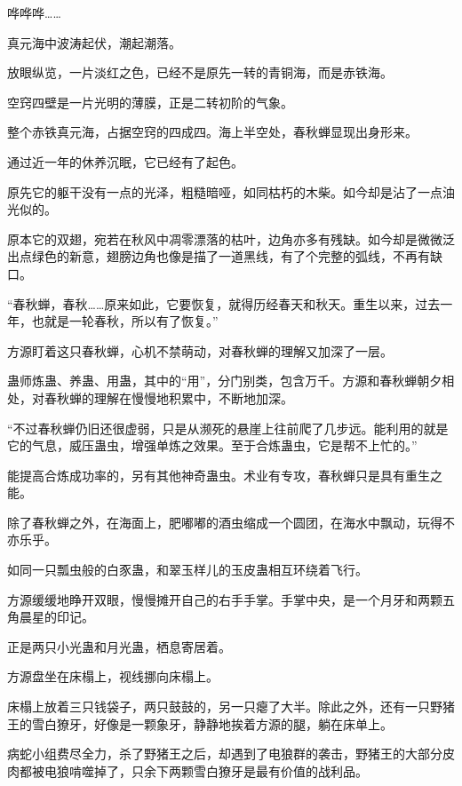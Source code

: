 
\begin{this_body}

哗哗哗……

真元海中波涛起伏，潮起潮落。

放眼纵览，一片淡红之色，已经不是原先一转的青铜海，而是赤铁海。

空窍四壁是一片光明的薄膜，正是二转初阶的气象。

整个赤铁真元海，占据空窍的四成四。海上半空处，春秋蝉显现出身形来。

通过近一年的休养沉眠，它已经有了起色。

原先它的躯干没有一点的光泽，粗糙暗哑，如同枯朽的木柴。如今却是沾了一点油光似的。

原本它的双翅，宛若在秋风中凋零漂落的枯叶，边角亦多有残缺。如今却是微微泛出点绿色的新意，翅膀边角也像是描了一道黑线，有了个完整的弧线，不再有缺口。

“春秋蝉，春秋……原来如此，它要恢复，就得历经春天和秋天。重生以来，过去一年，也就是一轮春秋，所以有了恢复。”

方源盯着这只春秋蝉，心机不禁萌动，对春秋蝉的理解又加深了一层。

蛊师炼蛊、养蛊、用蛊，其中的“用”，分门别类，包含万千。方源和春秋蝉朝夕相处，对春秋蝉的理解在慢慢地积累中，不断地加深。

“不过春秋蝉仍旧还很虚弱，只是从濒死的悬崖上往前爬了几步远。能利用的就是它的气息，威压蛊虫，增强单炼之效果。至于合炼蛊虫，它是帮不上忙的。”

能提高合炼成功率的，另有其他神奇蛊虫。术业有专攻，春秋蝉只是具有重生之能。

除了春秋蝉之外，在海面上，肥嘟嘟的酒虫缩成一个圆团，在海水中飘动，玩得不亦乐乎。

如同一只瓢虫般的白豕蛊，和翠玉样儿的玉皮蛊相互环绕着飞行。

方源缓缓地睁开双眼，慢慢摊开自己的右手手掌。手掌中央，是一个月牙和两颗五角晨星的印记。

正是两只小光蛊和月光蛊，栖息寄居着。

方源盘坐在床榻上，视线挪向床榻上。

床榻上放着三只钱袋子，两只鼓鼓的，另一只瘪了大半。除此之外，还有一只野猪王的雪白獠牙，好像是一颗象牙，静静地挨着方源的腿，躺在床单上。

病蛇小组费尽全力，杀了野猪王之后，却遇到了电狼群的袭击，野猪王的大部分皮肉都被电狼啃噬掉了，只余下两颗雪白獠牙是最有价值的战利品。


\end{this_body}
